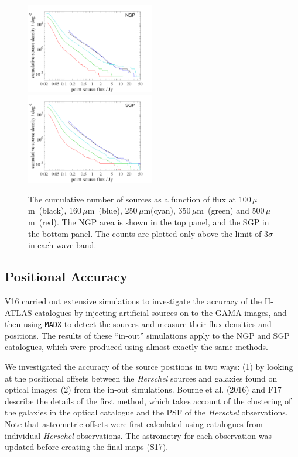 \documentclass[a4paper,fleqn,usenatbib, twocolumn]{aastex61}
\def\mic{\,$\mu $m}
\begin{document}
\begin{figure}
\textsl{}  \includegraphics[width=0.5\textwidth]{cum_counts_best_NGP.pdf}\\
  \includegraphics[width=0.5\textwidth]{cum_counts_best_SGP.pdf}
  \caption{\protect\label{fig_cum_flux} The cumulative number of
    sources as a function of flux at 100\mic\ (black), 160\mic\ (blue),
    250\mic (cyan), 350\mic\ (green) and 500\mic\ (red). The NGP area is
    shown in the top panel, and the SGP in the bottom panel. The
    counts are plotted only above the limit of 3$\sigma$ in each wave
    band.  }
\end{figure}  

\subsection{Positional Accuracy}

V16 carried out extensive simulations to investigate the accuracy of
the H-ATLAS catalogues by injecting artificial sources on to the GAMA
images, and then using {\tt MADX} to detect the sources and measure their
flux densities and positions. The results of these ``in-out''
simulations apply to the NGP and SGP catalogues, which were produced
using almost exactly the same methods.

We investigated the accuracy of the source positions in two ways: (1)
by looking at the positional offsets between the {\it Herschel}
sources and galaxies found on optical images; (2) from the in-out
simulations.  Bourne et al. (2016) and F17 describe the details of the
first method, which takes account of the clustering of the galaxies in
the optical catalogue and the PSF of the {\it Herschel} observations.
Note that astrometric offsets were first calculated using catalogues
from individual {\it Herschel} observations. The astrometry for each
observation was updated before creating the final maps (S17).
\end{document}
